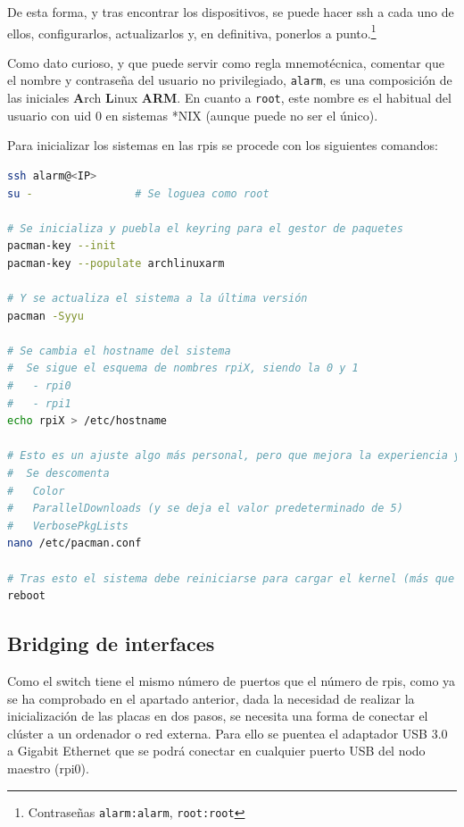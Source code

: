De esta forma, y tras encontrar los dispositivos, se puede hacer \acrshort{ssh} a cada uno de ellos, configurarlos, actualizarlos y, en definitiva, ponerlos a punto.\footnote{Contraseñas \texttt{alarm:alarm}, \texttt{root:root}}

Como dato curioso, y que puede servir como regla mnemotécnica, comentar que el nombre y contraseña del usuario no privilegiado, \texttt{alarm}, es una composición de las iniciales \textbf{A}rch \textbf{L}inux \textbf{ARM}. En cuanto a \texttt{root}, este nombre es el habitual del usuario con \acrshort{uid} 0 en sistemas *NIX (aunque puede no ser el único).

Para inicializar los sistemas en las \acrshort{rpi}s se procede con los siguientes comandos:

\begin{lstlisting}[language=bash]
ssh alarm@<IP>
su -                # Se loguea como root

# Se inicializa y puebla el keyring para el gestor de paquetes
pacman-key --init
pacman-key --populate archlinuxarm

# Y se actualiza el sistema a la última versión
pacman -Syyu

# Se cambia el hostname del sistema
#  Se sigue el esquema de nombres rpiX, siendo la 0 y 1
#   - rpi0
#   - rpi1
echo rpiX > /etc/hostname

# Esto es un ajuste algo más personal, pero que mejora la experiencia y velocidad en las actualizaciones: se edita el archivo /etc/pacman.conf
#  Se descomenta
#   Color
#   ParallelDownloads (y se deja el valor predeterminado de 5)
#   VerbosePkgLists
nano /etc/pacman.conf

# Tras esto el sistema debe reiniciarse para cargar el kernel (más que probablemente) actualizado. Tras el arranque se debe verificar que todo funcione correctamente.
reboot
\end{lstlisting}

\subsection{Bridging de interfaces}
Como el switch tiene el mismo número de puertos que el número de \acrshort{rpi}s, como ya se ha comprobado en el apartado anterior, dada la necesidad de realizar la inicialización de las placas en dos pasos, se necesita una forma de conectar el clúster a un ordenador o red externa. Para ello se puentea el adaptador USB 3.0 a Gigabit Ethernet que se podrá conectar en cualquier puerto USB del nodo maestro (rpi0).


